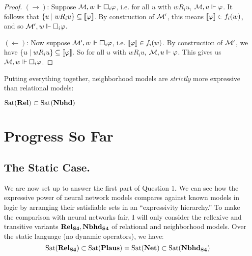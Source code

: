 \documentclass[letterpaper]{article}
\begin{document}
\begin{example*}
\begin{proof}
        $(\to)$: Suppose $\mathcal{M}, w \Vdash \Box_i \varphi$, i.e. for all $u$ with $w{R_i}u$, $\mathcal{M}, u \Vdash \varphi$.  It follows that $\{ u \mid w{R_i}u  \} \subseteq [\![\mbox{\em $ \varphi $\/}]\!]$. By construction of $\mathcal{M}'$, this means $[\![\mbox{\em $ \varphi $\/}]\!] \in f_i(w)$, and so $\mathcal{M}', w \Vdash \Box_i \varphi$.

        $(\leftarrow)$: Now suppose $\mathcal{M}', w \Vdash \Box_i \varphi$, i.e. $[\![\mbox{\em $ \varphi $\/}]\!] \in f_i(w)$.  By construction of $\mathcal{M}'$, we have $\{ u \mid w{R_i}u  \} \subseteq [\![\mbox{\em $ \varphi $\/}]\!]$.  So for all $u$ with $w{R_i}u$, $\mathcal{M}, u \Vdash \varphi$.  This gives us $\mathcal{M}, w \Vdash \Box_i \varphi$.
    \end{proof}

    Putting everything together, neighborhood models are \emph{strictly} more expressive than relational models:
    \begin{proposition}
        $\mathrm{Sat}( \textrm{\textbf{Rel}} ) \subset \mathrm{Sat}( \textrm{\textbf{Nbhd}} )$
    \end{proposition}

\end{example*}


\section*{Progress So Far}

\subsection*{The Static Case.}

We are now set up to answer the first part of Question 1.  We can see how the expressive power of neural network models compares against known models in logic by arranging their satisfiable sets in an ``expressivity hierarchy.''  To make the comparison with neural networks fair, I will only consider the reflexive and transitive variants $\textrm{\textbf{Rel}}_\textrm{\textbf{S4}}, \textrm{\textbf{Nbhd}}_\textrm{\textbf{S4}}$ of relational and neighborhood models.  Over the static language (no dynamic operators), we have:
\[
\mathrm{Sat}( \textrm{\textbf{Rel}}_\textrm{\textbf{S4}} ) \subset \mathrm{Sat}( \textrm{\textbf{Plaus}} ) = \mathrm{Sat}( \textrm{\textbf{Net}} ) \subset \mathrm{Sat}( \textrm{\textbf{Nbhd}}_\textrm{\textbf{S4}} )
\]
\end{document}
